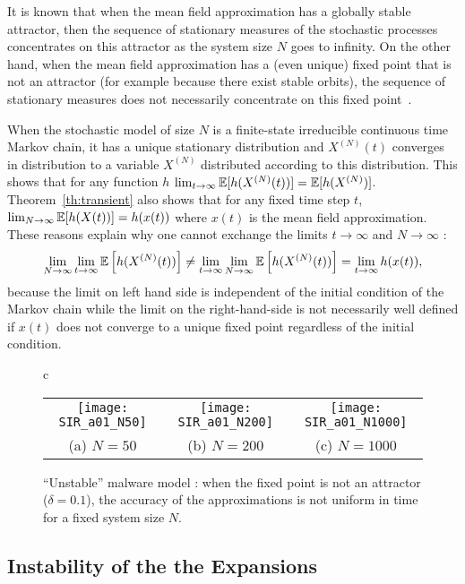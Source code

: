 \documentclass[sigconf]{acmart}
\newcommand\XN{X^{(N)}}
\newcommand\esp[1]{{\mathchoice{\besp{#1}}{\sesp{#1}}{\sesp{#1}}{\sesp{#1}}}}
\newcommand\besp[1]{\mathbb{E}\left[#1\right]}
\newcommand\sesp[1]{\mathbb{E}[#1]}
\begin{document}
It is known that when the mean field approximation has a globally
stable attractor, then the sequence of stationary measures of the
stochastic processes concentrates on this attractor as the system size
$N$ goes to infinity. On the other hand, when the mean field
approximation has a (even unique) fixed point that is not an attractor
(for example because there exist stable orbits), the sequence of
stationary measures does not necessarily concentrate on this fixed
point~\cite{benaim2008class,cho2012asymptotic}.

When the stochastic model of size $N$ is a finite-state irreducible
continuous time Markov chain, it has a unique stationary distribution
and $\XN(t)$ converges in distribution to a variable $\XN$ distributed
according to this distribution. This shows that for any function $h$
$\lim_{t\to\infty}\esp{h(\XN(t))} =
\esp{h(\XN)}$. Theorem~\ref{th:transient} also shows that for any
fixed time step $t$, $\lim_{N\to\infty}\esp{h(X(t))}=h(x(t))$ where
$x(t)$ is the mean field approximation. These reasons explain why one
cannot exchange the limits $t\to\infty$ and $N\to\infty$ :
\begin{align*}
  \lim_{N\to\infty}\lim_{t\to\infty}\esp{h(\XN(t))} \ne
  \lim_{t\to\infty}\lim_{N\to\infty}\esp{h(\XN(t))} =
  \lim_{t\to\infty}h(x(t)),
\end{align*}
because the limit on left hand side is independent of the initial
condition of the Markov chain while the limit on the right-hand-side
is not necessarily well defined if $x(t)$ does not converge to a
unique fixed point regardless of the initial condition.

\begin{figure*}[ht]
  \centering
  \begin{tabular}{c}
    \begin{tabular}{@{}c@{}c@{}c@{}}
      \texttt{[image: SIR\_a01\_N50]}
      &\texttt{[image: SIR\_a01\_N200]}
      &\texttt{[image: SIR\_a01\_N1000]}\\
      (a) $N=50$&(b) $N=200$&(c) $N=1000$
    \end{tabular}
  \end{tabular}
  \caption{``Unstable'' malware model : when the fixed point is not an
    attractor ($\delta=0.1$), the accuracy of the approximations is
    not uniform in time for a fixed system size $N$. }
  \label{fig:unstableSIR}
\end{figure*}

\subsection{Instability of the the Expansions}
\end{document}
